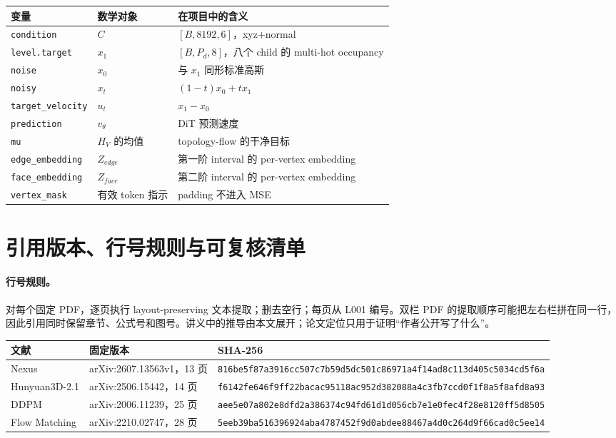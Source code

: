 \documentclass[11pt,a4paper]{ctexart}
\begin{document}
\begin{longtable}{p{3.2cm}p{4.0cm}p{7.3cm}}
\toprule
变量 & 数学对象 & 在项目中的含义\\
\midrule
\texttt{condition} & $C$ & $[B,8192,6]$，xyz+normal\\
\texttt{level.target} & $x_1$ & $[B,P_d,8]$，八个 child 的 multi-hot occupancy\\
\texttt{noise} & $x_0$ & 与 $x_1$ 同形标准高斯\\
\texttt{noisy} & $x_t$ & $(1-t)x_0+t x_1$\\
\texttt{target\_velocity} & $u_t$ & $x_1-x_0$\\
\texttt{prediction} & $v_\theta$ & DiT 预测速度\\
\texttt{mu} & $H_V$ 的均值 & topology-flow 的干净目标\\
\texttt{edge\_embedding} & $Z_{edge}$ & 第一阶 interval 的 per-vertex embedding\\
\texttt{face\_embedding} & $Z_{face}$ & 第二阶 interval 的 per-vertex embedding\\
\texttt{vertex\_mask} & 有效 token 指示 & padding 不进入 MSE\\
\bottomrule
\end{longtable}

\section*{引用版本、行号规则与可复核清单}

\paragraph{行号规则。} 对每个固定 PDF，逐页执行 layout-preserving 文本提取；删去空行；每页从 L001 编号。双栏 PDF 的提取顺序可能把左右栏拼在同一行，因此引用同时保留章节、公式号和图号。讲义中的推导由本文展开；论文定位只用于证明“作者公开写了什么”。

\begin{longtable}{p{3.0cm}p{3.4cm}p{8.8cm}}
\toprule
文献 & 固定版本 & SHA-256\\
\midrule
Nexus & arXiv:2607.13563v1，13 页 & \texttt{816be5f87a3916cc507c7b59d5dc501c}\newline\texttt{86971a4f14ad8c113d405c5034cd5f6a}\\
Hunyuan3D-2.1 & arXiv:2506.15442，14 页 & \texttt{f6142fe646f9ff22bacac95118ac952d3}\newline\texttt{82088a4c3fb7ccd0f1f8a5f8afd8a93}\\
DDPM & arXiv:2006.11239，25 页 & \texttt{aee5e07a802e8dfd2a386374c94fd61d}\newline\texttt{1d056cb7e1e0fec4f28e8120ff5d8505}\\
Flow Matching & arXiv:2210.02747，28 页 & \texttt{5eeb39ba516396924aba4787452f9d0ab}\newline\texttt{dee88467a4d0c264d9f66cad0c5ee14}\\
\bottomrule
\end{longtable}
\end{document}
